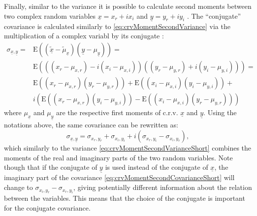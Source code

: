 \documentclass[
]{book}
\begin{document}
Finally, similar to the variance it is possible to calculate second moments between two complex random variables \(\underline{x} = x_r+i x_i\) and \(\underline{y} = y_r + i y_i\) \citep{Picinbono1997}. The ``conjugate'' covariance is calculated similarly to \eqref{eq:crvMomentSecondVariance} via the multiplication of a complex variabl by its conjugate \citep{Neeser1993}:
\begin{equation}
    \begin{aligned}
    \sigma_{\underline{x},\underline{y}} = & \mathrm{E}((\tilde{\underline{x}}-\tilde{\mu}_{\underline{x}}) (\underline{y}-\mu_{\underline{y}})) = \\
                   & \mathrm{E}\left(((x_r-\mu_{x,r}) - i (x_i-\mu_{x,i}))((y_r-\mu_{y,r}) + i (y_i-\mu_{y,i}))\right) = \\
                   & \mathrm{E}((x_r-\mu_{x,r})(y_r-\mu_{y,r})) + \mathrm{E}((x_i-\mu_{x,i})(y_i-\mu_{y,i})) + \\
                   & i \left(\mathrm{E}((x_r-\mu_{x,r})(y_i-\mu_{y,i})) - \mathrm{E}((x_i-\mu_{x,i})(y_r-\mu_{y,r}))\right)
    \end{aligned}
    \label{eq:crvMomentSecondCovariance}
\end{equation}
where \(\mu_{\underline{x}}\) and \(\mu_{\underline{y}}\) are the respective first moments of c.r.v. \(\underline{x}\) and \(\underline{y}\). Using the notations above, the same covariance can be rewritten as:
\begin{equation}
    \sigma_{\underline{x},\underline{y}} = \sigma_{x_r, y_r} + \sigma_{x_i, y_i} + i (\sigma_{x_r, y_i} - \sigma_{x_i, y_r}),
    \label{eq:crvMomentSecondCovarianceShort}
\end{equation}
which similarly to the variance \eqref{eq:crvMomentSecondVarianceShort} combines the moments of the real and imaginary parts of the two random variables. Note though that if the conjugate of \(\underline{y}\) is used instead of the conjugate of \(\underline{x}\), the imaginary part of the covariance \eqref{eq:crvMomentSecondCovarianceShort} will change to \(\sigma_{x_i, y_r} - \sigma_{x_r, y_i}\), giving potentially different information about the relation between the variables. This means that the choice of the conjugate is important for the conjugate covariance.
\end{document}
